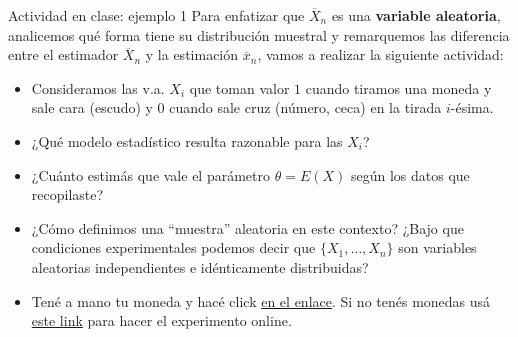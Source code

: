 \documentclass{beamer}
\theoremstyle{definition}
\begin{document}
\begin{frame}{\color{rosee} Actividad en clase: ejemplo 1}\small
Para enfatizar que $\overline{X}_n$ es una \textbf{variable aleatoria}, analicemos qué forma tiene su distribución muestral y remarquemos las diferencia entre el estimador $\overline{X}_n$ y la estimación $\overline{x}_n$,  vamos a realizar la siguiente actividad:\medskip
\begin{itemize}
    \item Consideramos las v.a. $X_i$ que toman valor $1$ cuando tiramos una moneda y sale cara (escudo) y 0 cuando sale cruz (número, ceca) en la tirada $i$-\'esima.\medskip
    \item ¿Qué modelo estadístico resulta razonable para las $X_i$? 
    \item  ¿Cuánto estimás que vale el parámetro $\theta = E(X)$ según los datos que recopilaste?\medskip  
    
    \item ¿Cómo definimos una ``muestra'' aleatoria en este contexto? ¿Bajo que condiciones experimentales podemos decir que $\{X_1,\dots,X_n\}$ son variables aleatorias independientes e idénticamente distribuidas?\medskip
    
  \item  Ten\'e a mano tu moneda y hac\'e click \href{https://docs.google.com/spreadsheets/d/1Xk34raiH3NqPtKeNKvnyUuBCSnd62Z8W311ljPjD0j8/edit?usp=sharing}{en el enlace}. Si no tenés monedas usá \href{https://www.random.org/coins/}{este link} para hacer el experimento online. %
    \end{itemize}
    \end{frame}



\end{document}
